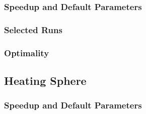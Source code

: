 \subsubsection{Speedup and Default Parameters}

\subsubsection{Selected Runs}
\subsubsection{Optimality}

\subsection{Heating Sphere}
\subsubsection{Speedup and Default Parameters}



